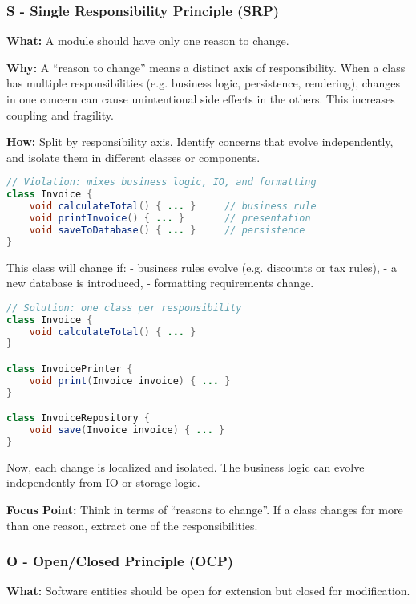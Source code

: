 \documentclass[a4paper,12pt]{article}
\begin{document}
\subsubsection{S - Single Responsibility Principle (SRP)}

\textbf{What:} A module should have only one reason to change.

\textbf{Why:} A “reason to change” means a distinct axis of responsibility. When a class has multiple responsibilities (e.g. business logic, persistence, rendering), changes in one concern can cause unintentional side effects in the others. This increases coupling and fragility.

\textbf{How:} Split by responsibility axis. Identify concerns that evolve independently, and isolate them in different classes or components.

\begin{lstlisting}[language=Java]
// Violation: mixes business logic, IO, and formatting
class Invoice {
    void calculateTotal() { ... }     // business rule
    void printInvoice() { ... }       // presentation
    void saveToDatabase() { ... }     // persistence
}
\end{lstlisting}

This class will change if:
- business rules evolve (e.g. discounts or tax rules),
- a new database is introduced,
- formatting requirements change.

\begin{lstlisting}[language=Java]
// Solution: one class per responsibility
class Invoice {
    void calculateTotal() { ... }
}

class InvoicePrinter {
    void print(Invoice invoice) { ... }
}

class InvoiceRepository {
    void save(Invoice invoice) { ... }
}
\end{lstlisting}

Now, each change is localized and isolated. The business logic can evolve independently from IO or storage logic.

\textbf{Focus Point:} Think in terms of “reasons to change”. If a class changes for more than one reason, extract one of the responsibilities.

\subsubsection{O - Open/Closed Principle (OCP)}

\textbf{What:} Software entities should be open for extension but closed for modification.
\end{document}
